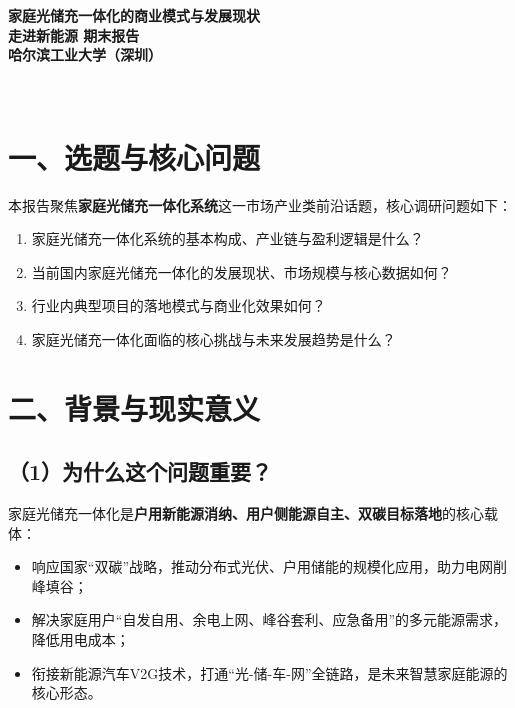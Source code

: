 \documentclass[12pt,a4paper,UTF8]{ctexart}
\begin{document}
\begin{titlepage}
    \centering
    \vspace*{3cm}
    \Huge\bfseries 家庭光储充一体化的商业模式与发展现状\\
    \vspace{1cm}
    \Large\bfseries 走进新能源 期末报告\\
    \vfill
    \Large 哈尔滨工业大学（深圳）
\end{titlepage}
\\[2em]
\section*{一、选题与核心问题}
本报告聚焦\textbf{家庭光储充一体化系统}这一市场产业类前沿话题，核心调研问题如下：
\begin{enumerate}
    \item 家庭光储充一体化系统的基本构成、产业链与盈利逻辑是什么？
    \item 当前国内家庭光储充一体化的发展现状、市场规模与核心数据如何？
    \item 行业内典型项目的落地模式与商业化效果如何？
    \item 家庭光储充一体化面临的核心挑战与未来发展趋势是什么？
\end{enumerate}

\section*{二、背景与现实意义}
\subsection*{（1）为什么这个问题重要？}
家庭光储充一体化是\textbf{户用新能源消纳、用户侧能源自主、双碳目标落地}的核心载体：
\begin{itemize}
    \item 响应国家“双碳”战略，推动分布式光伏、户用储能的规模化应用，助力电网削峰填谷；
    \item 解决家庭用户“自发自用、余电上网、峰谷套利、应急备用”的多元能源需求，降低用电成本；
    \item 衔接新能源汽车V2G技术，打通“光-储-车-网”全链路，是未来智慧家庭能源的核心形态。
\end{itemize}
\end{document}
